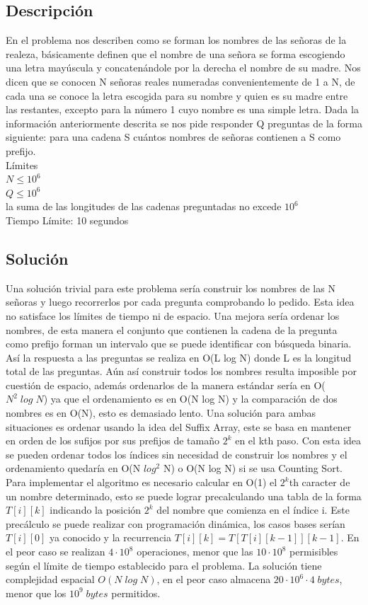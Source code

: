 \documentclass{report}
\begin{document}
\subsection{Descripci\'on}
En el problema nos describen como se forman los nombres de las se\~noras de la realeza, b\'asicamente definen que el nombre de una se\~nora se forma escogiendo una letra may\'uscula y concaten\'andole por la derecha el nombre de su madre. Nos dicen que se conocen N se\~noras reales numeradas convenientemente de 1 a N, de cada una se conoce la letra escogida para su nombre y quien es su madre entre las restantes, excepto para la n\'umero 1 cuyo nombre es una simple letra.
Dada la informaci\'on anteriormente descrita se nos pide responder Q preguntas de la forma siguiente: para una cadena S cu\'antos nombres de se\~noras contienen a S como prefijo.\\
L\'imites\\
$N \leq 10^6$\\
$Q \leq 10^6$\\
la suma de las longitudes de las cadenas preguntadas no excede $10^6$\\
Tiempo L\'imite: 10 segundos\\

\subsection{Soluci\'on}
Una soluci\'on trivial para este problema ser\'ia construir los nombres de las N se\~noras y luego recorrerlos por cada pregunta comprobando lo pedido. Esta idea no satisface los l\'imites de tiempo ni de espacio. Una mejora ser\'ia ordenar los nombres, de esta manera el conjunto que contienen la cadena de la pregunta como prefijo forman un intervalo que se puede identificar con b\'usqueda binaria. As\'i la respuesta a las preguntas se realiza en O(L log N) donde L es la longitud total de las preguntas. A\'un as\'i construir todos los nombres resulta imposible por cuesti\'on de espacio, adem\'as ordenarlos de la manera est\'andar ser\'ia en O($N^2\;log\;N$) ya que el ordenamiento es en O(N log N) y la comparaci\'on de dos nombres es en O(N), esto es demasiado lento. Una soluci\'on para ambas situaciones es ordenar usando la idea del Suffix Array, este se basa en mantener en orden de los sufijos por sus prefijos de tama\~no $2^k$ en el kth paso\cite{SuffixArray}. Con esta idea se pueden ordenar todos los \'indices sin necesidad de construir los nombres y el ordenamiento quedar\'ia en O(N $log^2$ N) o O(N log N) si se usa Counting Sort. Para implementar el algoritmo es necesario calcular en O(1) el $2^k$th caracter de un nombre determinado, esto se puede lograr precalculando una tabla de la forma $T[i][k]$ indicando la posici\'on $2^k$ del nombre que comienza en el \'indice i. Este prec\'alculo se puede realizar con programaci\'on din\'amica, los casos bases ser\'ian $T[i][0]$ ya conocido y la recurrencia $T[i][k]=T[ T[i][k-1] ][k-1]$. En el peor caso se realizan $4\cdot 10^8$ operaciones, menor que las $10 \cdot 10^8$ permisibles seg\'un el l\'imite de tiempo establecido para el problema. La soluci\'on tiene complejidad espacial $O(N \;log\;N)$, en el peor caso almacena $20\cdot 10^6 \cdot 4\; bytes$, menor que los $10^9 \;bytes$ permitidos.
\end{document}
